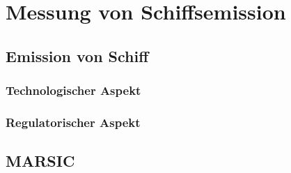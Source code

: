 
\chapter{Messung von Schiffsemission}


\section{Emission von Schiff}


\subsection{Technologischer Aspekt}


\subsection{Regulatorischer Aspekt}


\section{MARSIC}

